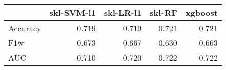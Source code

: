 \begin{tabular}{lrrrr}
\toprule
{} &  skl-SVM-l1 &  skl-LR-l1 &  skl-RF &  xgboost \\
\midrule
Accuracy &       0.719 &      0.719 &   0.721 &    0.721 \\
F1w      &       0.673 &      0.667 &   0.630 &    0.663 \\
AUC      &       0.710 &      0.720 &   0.722 &    0.722 \\
\bottomrule
\end{tabular}
